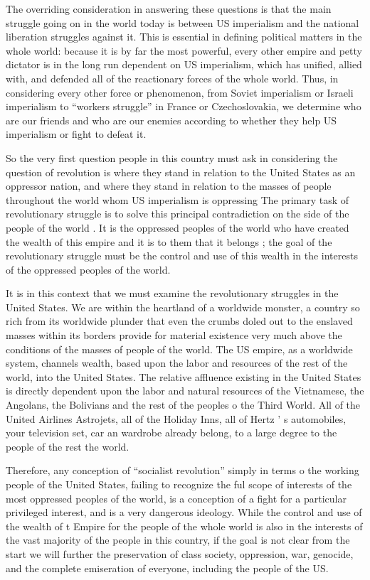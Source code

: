 \documentclass[12pt, titlepage]{article}
\begin{document}
{\begin{spacing}{1.10}
The overriding consideration in answering these questions is that the main struggle going on in the world today is between US imperialism and the national liberation struggles against it. This is essential in defining political matters in the whole world: because it is by far the most powerful, every other empire and petty dictator is in the long run dependent on US imperialism, which has unified, allied with, and defended all of the reactionary forces of the whole world. Thus, in considering every other force or phenomenon, from Soviet imperialism or Israeli imperialism to ``workers struggle'' in France or Czechoslovakia, we determine who are our friends and who are our enemies according to whether they help US imperialism or fight to defeat it.

So the very first question people in this country must ask in considering the question of revolution is where they stand in relation to the United States as an oppressor nation, and where they stand in relation to the masses of people throughout the world whom US imperialism is oppressing
The primary task of revolutionary struggle is to solve this principal contradiction on the side of the people of the world . It is the oppressed peoples of the world who have created the wealth of this empire and it is to them that it belongs ; the goal of the revolutionary struggle must be the control and use of this wealth in the interests of the oppressed peoples of the world.

It is in this context that we must examine the revolutionary struggles in the United States. We are within the heartland of a worldwide monster, a country so rich from its worldwide plunder that even the crumbs doled out to the enslaved masses within its borders provide for material existence very much above the conditions of the masses of people of the world. The US empire, as a worldwide system, channels wealth, based upon the labor and resources of the rest of the world, into the United States. The relative affluence existing in the United States is directly dependent upon the labor and natural resources of the Vietnamese, the Angolans, the Bolivians and the rest of the peoples o the Third World. All of the United Airlines Astrojets, all of the Holiday Inns, all of Hertz ' s automobiles, your television set, car an wardrobe already belong, to a large degree to the people of the rest the world.

Therefore, any conception of ``socialist revolution'' simply in terms o the working people of the United States, failing to recognize the ful scope of interests of the most oppressed peoples of the world, is a conception of a fight for a particular privileged interest, and is a very dangerous ideology. While the control and use of the wealth of t Empire for the people of the whole world is also in the interests of the
vast majority of the people in this country, if the goal is not clear from the start we will further the preservation of class society, oppression, war, genocide, and the complete emiseration of everyone, including the people of the US.


\end{spacing}}
\end{document}
